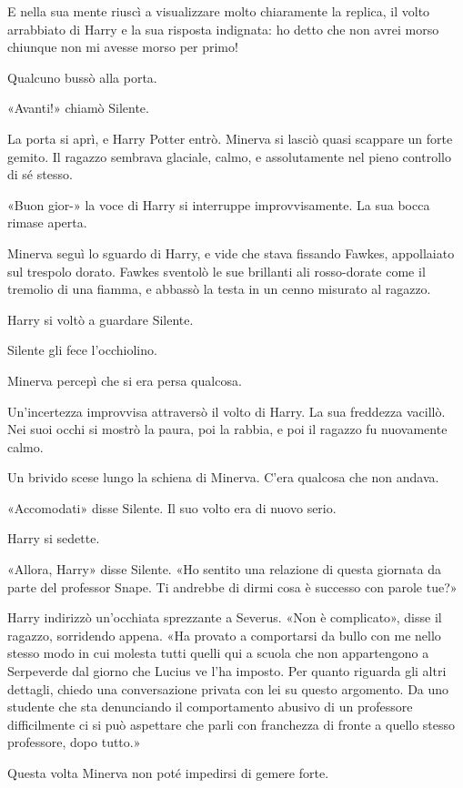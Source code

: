 E nella sua mente riuscì a visualizzare molto chiaramente la replica, il volto arrabbiato di Harry e la sua risposta indignata: ho detto che non avrei morso chiunque non mi avesse morso per primo!

Qualcuno bussò alla porta.

«Avanti!» chiamò Silente.

La porta si aprì, e Harry Potter entrò. Minerva si lasciò quasi scappare un forte gemito. Il ragazzo sembrava glaciale, calmo, e assolutamente nel pieno controllo di sé stesso.

«Buon gior-» la voce di Harry si interruppe improvvisamente. La sua bocca rimase aperta.

Minerva seguì lo sguardo di Harry, e vide che stava fissando Fawkes, appollaiato sul trespolo dorato. Fawkes sventolò le sue brillanti ali rosso-dorate come il tremolio di una fiamma, e abbassò la testa in un cenno misurato al ragazzo.

Harry si voltò a guardare Silente.

Silente gli fece l’occhiolino.

Minerva percepì che si era persa qualcosa.

Un’incertezza improvvisa attraversò il volto di Harry. La sua freddezza vacillò. Nei suoi occhi si mostrò la paura, poi la rabbia, e poi il ragazzo fu nuovamente calmo.

Un brivido scese lungo la schiena di Minerva. C’era qualcosa che non andava.

«Accomodati» disse Silente. Il suo volto era di nuovo serio.

Harry si sedette.

«Allora, Harry» disse Silente. «Ho sentito una relazione di questa giornata da parte del professor Snape. Ti andrebbe di dirmi cosa è successo con parole tue?»

Harry indirizzò un’occhiata sprezzante a Severus. «Non è complicato», disse il ragazzo, sorridendo appena. «Ha provato a comportarsi da bullo con me nello stesso modo in cui molesta tutti quelli qui a scuola che non appartengono a Serpeverde dal giorno che Lucius ve l’ha imposto. Per quanto riguarda gli altri dettagli, chiedo una conversazione privata con lei su questo argomento. Da uno studente che sta denunciando il comportamento abusivo di un professore difficilmente ci si può aspettare che parli con franchezza di fronte a quello stesso professore, dopo tutto.»

Questa volta Minerva non poté impedirsi di gemere forte.

